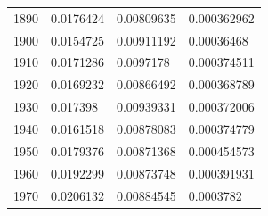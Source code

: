 \begin{center}
\begin{longtable}{l|l|l|l}
1890                                                   & 0.0176424                                                         & 0.00809635                                               & 0.000362962                                                        \\
1900                                                   & 0.0154725                                                         & 0.00911192                                               & 0.00036468                                                         \\
1910                                                   & 0.0171286                                                         & 0.0097178                                                & 0.000374511                                                        \\
1920                                                   & 0.0169232                                                         & 0.00866492                                               & 0.000368789                                                        \\
1930                                                   & 0.017398                                                          & 0.00939331                                               & 0.000372006                                                        \\
1940                                                   & 0.0161518                                                         & 0.00878083                                               & 0.000374779                                                        \\
1950                                                   & 0.0179376                                                         & 0.00871368                                               & 0.000454573                                                        \\
1960                                                   & 0.0192299                                                         & 0.00873748                                               & 0.000391931                                                        \\
1970                                                   & 0.0206132                                                         & 0.00884545                                               & 0.0003782                                                          \\

\end{longtable}
\end{center}
